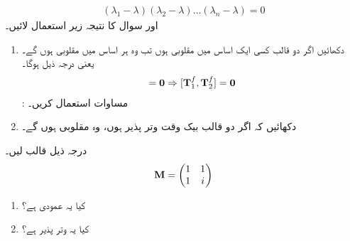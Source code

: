\begin{align*}
	(\lambda_1-\lambda)(\lambda_2-\lambda)\dots(\lambda_n-\lambda) = 0
\end{align*}
اور سوال    کا نتیجہ زیر  استعمال  لائیں۔
\begin{enumerate}[a]
\item
دکھائیں اگر دو قالب کسی ایک اساس میں مقلوبی ہوں تب وہ ہر اساس میں مقلوبی ہوں گے۔  یعنی درجہ ذیل ہوگا۔
\begin{align}
	[\mat{T}^e_1, \mat{T}^e_2] = \mat{0} \Rightarrow [\mat{T}^f_1, \mat{T}^f_2] = \mat{0}
\end{align}
: مساوات   استعمال کریں۔
\item
 دکھائیں کہ اگر دو قالب بیک وقت وتر پذیر ہوں، وہ مقلوبی ہوں گے۔
 \end{enumerate}
درجہ ذیل قالب لیں۔
\begin{align*}
	\operatorname{\mathbf{M}}=
	\begin{pmatrix}
		1 & 1\\
		1 & i
	\end{pmatrix}
\end{align*}
\begin{enumerate}[a]
\item
 کیا یہ عمودی  ہے؟
\item
 کیا یہ وتر پذیر  ہے؟
 \end{enumerate}


